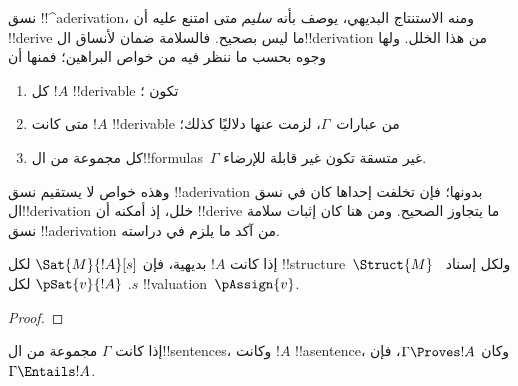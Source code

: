 \documentclass[../../../include/open-logic-section]{subfiles}
\begin{document}
      {}
      {}


\begin{explain}
نسق !!^a{derivation}، ومنه الاستنتاج البديهي، يوصف بأنه \emph{سليم}
متى امتنع عليه أن !!{derive} ما ليس بصحيح. فالسلامة ضمان لأنساق
ال!!{derivation} من هذا الخلل. ولها وجوه بحسب ما ننظر فيه من خواص
البراهين؛ فمنها أن
\begin{enumerate}
\item كل $!A$ !!{derivable} تكون ؛
\item متى كانت $!A$ !!{derivable} من عبارات~$\Gamma$، لزمت عنها
  دلاليًا كذلك؛
\item كل مجموعة من ال!!{formula}s~$\Gamma$ غير متسقة تكون غير قابلة
  للإرضاء.
\end{enumerate}
وهذه خواص لا يستقيم نسق !!a{derivation} بدونها؛ فإن تخلفت إحداها
كان في نسق ال!!{derivation} خلل، إذ أمكنه أن !!{derive} ما يتجاوز
الصحيح. ومن هنا كان إثبات سلامة نسق !!a{derivation} من آكد ما يلزم
في دراسته.
\end{explain}

\begin{prop}
  إذا كانت $!A$ بديهية، فإن
    {$\Sat{M}{!A}[s]$ لكل !!{structure}~$\Struct{M}$ ولكل إسناد~$s$.}
    {$\pSat{v}{!A}$ لكل !!{valuation}~$\pAssign{v}$.}
\end{prop}

\begin{proof}
\end{proof}

\begin{thm}[السلامة]
إذا كانت $\Gamma$ مجموعة من ال!!{sentence}s، وكانت $!A$ !!a{sentence}،
وكان $\Gamma \Proves !A$، فإن $\Gamma \Entails !A$.
\end{thm}
\end{document}
